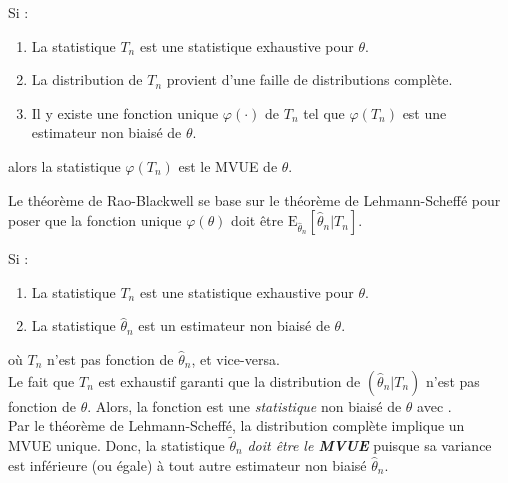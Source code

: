 \documentclass[10pt, french]{article}
\begin{document}
\begin{multicols*}{2}
	
\begin{definitionNOHFILLsub}
Si : 
\begin{enumerate}[label = \circled{\arabic*}{trueblue}]
	\item	La statistique $T_{n}$ est une statistique exhaustive pour $\theta$.
	\item	La distribution de $T_{n}$ provient d'une faille de distributions complète.
	\item	Il y existe une fonction unique $\varphi(\cdot)$ de $T_{n}$ tel que $\varphi(T_{n})$ est une estimateur non biaisé de $\theta$.
\end{enumerate}
alors la statistique $\varphi(T_{n})$ est le MVUE de $\theta$.
\end{definitionNOHFILLsub}


\begin{rappel_enhanced}[Contexte]
Le théorème de Rao-Blackwell se base sur le théorème de Lehmann-Scheffé pour poser que la fonction unique $\varphi(\theta)$ doit être $\text{E}_{\hat{\theta}_{n}}[\hat{\theta}_{n} | T_{n}]$.
\end{rappel_enhanced}

\begin{definitionNOHFILLsub}
Si : 
\begin{enumerate}
	\item	La statistique $T_{n}$ est une statistique exhaustive pour $\theta$.
	\item	La statistique $\hat{\theta}_{n}$ est un estimateur non biaisé de $\theta$.
\end{enumerate}
où $T_{n}$ n'est pas fonction de $\hat{\theta}_{n}$, et vice-versa. 	\\

Le fait que $T_{n}$ est exhaustif garanti que la distribution de $(\hat{\theta}_{n} | T_{n})$ n'est pas fonction de $\theta$. Alors, la fonction  est une \textit{statistique} non biaisé de $\theta$ avec .\\

Par le théorème de Lehmann-Scheffé, la distribution complète implique un MVUE unique. Donc, la statistique $\tilde{\theta}_{n}$ \textit{doit être le \textbf{MVUE}} puisque sa variance est inférieure (ou égale) à tout autre estimateur non biaisé $\hat{\theta}_{n}$.
\end{definitionNOHFILLsub}



\end{multicols*}
\end{document}
